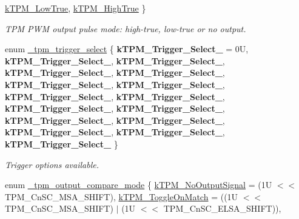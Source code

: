 \begin{DoxyCompactItemize}
\mbox{\hyperlink{group__tpm_gga1efad91e0bd88db60f58667c720d472ca5ab6f0dff57ca92272ff7d563ece0629}{k\+T\+P\+M\+\_\+\+Low\+True}}, 
\mbox{\hyperlink{group__tpm_gga1efad91e0bd88db60f58667c720d472ca33357d6aa2305f0e4881b27399de55ee}{k\+T\+P\+M\+\_\+\+High\+True}}
 \}
\begin{DoxyCompactList}\small\item\em T\+PM P\+WM output pulse mode\+: high-\/true, low-\/true or no output. \end{DoxyCompactList}\item 
enum \mbox{\hyperlink{group__tpm_ga4150281c92685f3d25f13279bdef4b0c}{\+\_\+tpm\+\_\+trigger\+\_\+select}} \{ \newline
{\bfseries k\+T\+P\+M\+\_\+\+Trigger\+\_\+\+Select\+\_} = 0U, 
{\bfseries k\+T\+P\+M\+\_\+\+Trigger\+\_\+\+Select\+\_}, 
{\bfseries k\+T\+P\+M\+\_\+\+Trigger\+\_\+\+Select\+\_}, 
{\bfseries k\+T\+P\+M\+\_\+\+Trigger\+\_\+\+Select\+\_}, 
\newline
{\bfseries k\+T\+P\+M\+\_\+\+Trigger\+\_\+\+Select\+\_}, 
{\bfseries k\+T\+P\+M\+\_\+\+Trigger\+\_\+\+Select\+\_}, 
{\bfseries k\+T\+P\+M\+\_\+\+Trigger\+\_\+\+Select\+\_}, 
{\bfseries k\+T\+P\+M\+\_\+\+Trigger\+\_\+\+Select\+\_}, 
\newline
{\bfseries k\+T\+P\+M\+\_\+\+Trigger\+\_\+\+Select\+\_}, 
{\bfseries k\+T\+P\+M\+\_\+\+Trigger\+\_\+\+Select\+\_}, 
{\bfseries k\+T\+P\+M\+\_\+\+Trigger\+\_\+\+Select\+\_}, 
{\bfseries k\+T\+P\+M\+\_\+\+Trigger\+\_\+\+Select\+\_}, 
\newline
{\bfseries k\+T\+P\+M\+\_\+\+Trigger\+\_\+\+Select\+\_}, 
{\bfseries k\+T\+P\+M\+\_\+\+Trigger\+\_\+\+Select\+\_}, 
{\bfseries k\+T\+P\+M\+\_\+\+Trigger\+\_\+\+Select\+\_}, 
{\bfseries k\+T\+P\+M\+\_\+\+Trigger\+\_\+\+Select\+\_}
 \}
\begin{DoxyCompactList}\small\item\em Trigger options available. \end{DoxyCompactList}\item 
enum \mbox{\hyperlink{group__tpm_ga9a2946f67b4b7513fcd580c48746b22c}{\+\_\+tpm\+\_\+output\+\_\+compare\+\_\+mode}} \{ \newline
\mbox{\hyperlink{group__tpm_gga9a2946f67b4b7513fcd580c48746b22ca9138cc3b25fc54000c123b79c922be2b}{k\+T\+P\+M\+\_\+\+No\+Output\+Signal}} = (1U $<$$<$ T\+P\+M\+\_\+\+Cn\+S\+C\+\_\+\+M\+S\+A\+\_\+\+S\+H\+I\+FT), 
\mbox{\hyperlink{group__tpm_gga9a2946f67b4b7513fcd580c48746b22ca0870b5b951e6b34dc26018d08c112cd7}{k\+T\+P\+M\+\_\+\+Toggle\+On\+Match}} = ((1U $<$$<$ T\+P\+M\+\_\+\+Cn\+S\+C\+\_\+\+M\+S\+A\+\_\+\+S\+H\+I\+FT) $\vert$ (1U $<$$<$ T\+P\+M\+\_\+\+Cn\+S\+C\+\_\+\+E\+L\+S\+A\+\_\+\+S\+H\+I\+FT)), 
$$
\end{DoxyCompactItemize}
